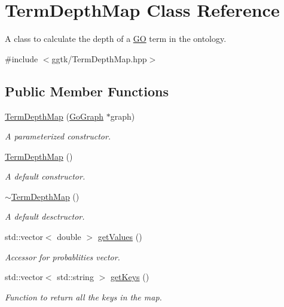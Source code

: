 \hypertarget{classTermDepthMap}{}\section{Term\+Depth\+Map Class Reference}
\label{classTermDepthMap}


A class to calculate the depth of a \hyperlink{namespaceGO}{GO} term in the ontology.  




{\ttfamily \#include $<$ggtk/\+Term\+Depth\+Map.\+hpp$>$}

\subsection*{Public Member Functions}
\begin{DoxyCompactItemize}
\item 
\hyperlink{classTermDepthMap_abb4c7ebeedc74ae59a8399de33b48389}{Term\+Depth\+Map} (\hyperlink{classGoGraph}{Go\+Graph} $\ast$graph)
\begin{DoxyCompactList}\small\item\em A parameterized constructor. \end{DoxyCompactList}\item 
\hyperlink{classTermDepthMap_a819c7cb3f26e54e13195a508aff06cdc}{Term\+Depth\+Map} ()
\begin{DoxyCompactList}\small\item\em A default constructor. \end{DoxyCompactList}\item 
\hyperlink{classTermDepthMap_aec4f9d62c638d0f6519d49bb13d96263}{$\sim$\+Term\+Depth\+Map} ()
\begin{DoxyCompactList}\small\item\em A default desctructor. \end{DoxyCompactList}\item 
std\+::vector$<$ double $>$ \hyperlink{classTermDepthMap_acad3e6559688f3338f7d28fffe53f3ab}{get\+Values} ()
\begin{DoxyCompactList}\small\item\em Accessor for probablities vector. \end{DoxyCompactList}\item 
std\+::vector$<$ std\+::string $>$ \hyperlink{classTermDepthMap_a2cc0c96cf91020df4a035f089ef1a608}{get\+Keys} ()
\begin{DoxyCompactList}\small\item\em Function to return all the keys in the map. \end{DoxyCompactList}\item 

\end{DoxyCompactItemize}
